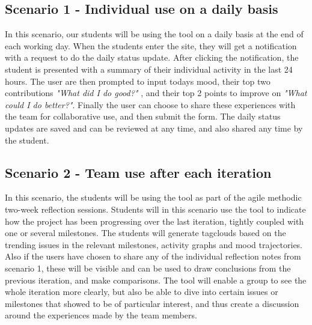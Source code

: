 
\subsection{Scenario 1 - Individual use on a daily basis}
\label{scenario1}
In this scenario, our students will be using the tool on a daily basis at the end of each working day. When the students enter the site, they will get a notification with a request to do the daily status update. After clicking the notification, the student is presented with a summary of their individual activity in the last 24 hours. The user are then prompted to input todays mood, their top two contributions \emph{"What did I do good?"} , and their top 2 points to improve on \emph{"What could I do better?"}. Finally the user can choose to share these experiences with the team for collaborative use, and then submit the form. The daily status updates are saved and can be reviewed at any time, and also shared any time by the student. 

\subsection{Scenario 2 - Team use after each iteration}
\label{scenario2}
In this scenario, the students will be using the tool as part of the agile methodic two-week reflection sessions. Students will in this scenario use the tool to indicate how the project has been progressing over the last iteration, tightly coupled with one or several milestones. The students will generate tagclouds based on the trending issues in the relevant milestones, activity graphs and mood trajectories. Also if the users have chosen to share any of the individual reflection notes from scenario 1, these will be visible and can be used to draw conclusions from the previous iteration, and make comparisons. The tool will enable a group to see the whole iteration more clearly, but also be able to dive into certain issues or milestones that showed to be of particular interest, and thus create a discussion around the experiences made by the team members.  